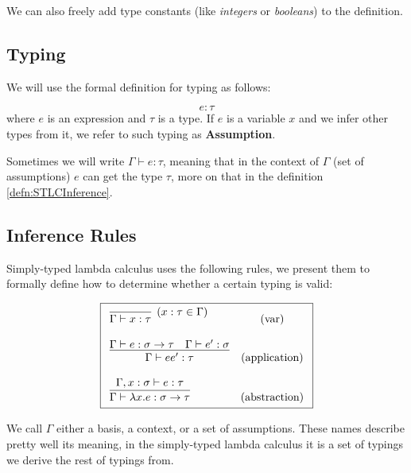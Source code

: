 We can also freely add type constants (like \emph{integers} or \emph{booleans}) to the definition.

\subsection{Typing}

We will use the formal definition for typing as follows:

\begin{defn}
    $$e : \tau$$
    where $e$ is an expression and $\tau$ is a type. If $e$ is a variable $x$ and we infer other types from it, we refer to such typing as \textbf{Assumption}.
\end{defn}

Sometimes we will write $\Gamma \vdash e : \tau$, meaning that in the context of $\Gamma$ (set of assumptions) $e$ can get the type $\tau$, more on that in the definition \ref{defn:STLCInference}.


\subsection{Inference Rules}

Simply-typed lambda calculus uses the following rules, we present them to formally define how to determine whether a certain typing is valid:

\begin{defn}
    \label{defn:STLCInference}
    $$\boxed{\begin{array}{l c}
        \infer[(x : \tau \in \Gamma)]{\Gamma \vdash x : \tau}{} & (\text{var}) \\\\
        \infer{\Gamma \vdash e e' : \tau}{\Gamma \vdash e : \sigma \rightarrow \tau \quad \Gamma \vdash e' : \sigma} & (\text{application}) \\\\
        \infer{\Gamma \vdash \lambda x . e : \sigma \rightarrow \tau}{\Gamma, x : \sigma \vdash e : \tau} & (\text{abstraction})
    \end{array}}$$
\end{defn}

We call $\Gamma$ either a basis, a context, or a set of assumptions. These names describe pretty well its meaning, in the simply-typed lambda calculus it is a set of typings we derive the rest of typings from.

